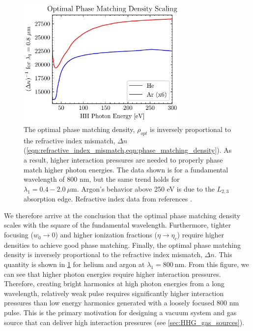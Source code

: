 \begin{figure}
	\centering
	\includegraphics[width=0.75\textwidth]{figures/chap1/recip_deltan_plot.pdf}
	\caption{The optimal phase matching density, $\rho_{opt}$ is inversely proportional to the refractive index mismatch, $\Delta n$ (\cref{eqn:refractive_index_mismatch,eqn:phase_matching_density}). As a result, higher interaction pressures are needed to properly phase match higher photon energies. The data shown is for a fundamental wavelength of 800 nm, but the same trend holds for $\lambda_1 = 0.4 - 2.0 \ \mu \textrm{m}$. Argon's behavior above 250 eV is due to the $L_{2,3}$ absorption edge. Refractive index data from references \cite{gulliksonCXROXRayInteractions,peckDispersionArgon1964,mansfieldDispersionHelium1969}.}
	\label{fig:recip_deltan_plot}
\end{figure}

We therefore arrive at the conclusion that the optimal phase matching density scales with the square of the fundamental wavelength. Furthermore, tighter focusing (${w_0 \rightarrow 0}$) and higher ionization fractions (${\eta \rightarrow \eta_c}$) require higher densities to achieve good phase matching. Finally, the optimal phase matching density is inversely proportional to the refractive index mismatch, $\Delta n$. This quantity is shown in \cref{fig:recip_deltan_plot} for helium and argon at $\lambda_1 = 800 \ \textrm{nm}$. From this figure, we can see that higher photon energies require higher interaction pressures. Therefore, creating bright harmonics at high photon energies from a long wavelength, relatively weak pulse requires significantly higher interaction pressures than low energy harmonics generated with a loosely focused 800 nm pulse. This is the primary motivation for designing a vacuum system and gas source that can deliver high interaction pressures (see \cref{sec:HHG_gas_sources}).

